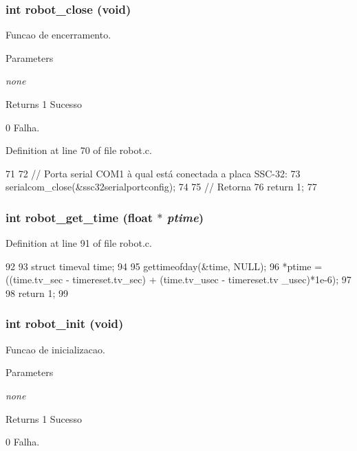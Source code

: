\subsubsection[{robot\_\-close}]{\setlength{\rightskip}{0pt plus 5cm}int robot\_\-close (void)}\label{robot_8c_a9a5e0a593aac8004a4b85da53e7354b3}


Funcao de encerramento. 
\begin{DoxyParams}{Parameters}
\item[{\em none}]\end{DoxyParams}
\begin{DoxyReturn}{Returns}
1 Sucesso 

0 Falha. 
\end{DoxyReturn}


Definition at line 70 of file robot.c.


\begin{DoxyCode}
71 {
72         // Porta serial COM1 à qual está conectada a placa SSC-32:
73         serialcom_close(&ssc32serialportconfig);
74         
75         // Retorna 
76         return 1; 
77 }                      
\end{DoxyCode}
\subsubsection[{robot\_\-get\_\-time}]{\setlength{\rightskip}{0pt plus 5cm}int robot\_\-get\_\-time (float $\ast$ {\em ptime})}\label{robot_8c_a03c4523c04948fd5b818ea22bf84480a}


Definition at line 91 of file robot.c.


\begin{DoxyCode}
92 {
93         struct timeval time;
94 
95         gettimeofday(&time, NULL);
96         *ptime = ((time.tv_sec - timereset.tv_sec) + (time.tv_usec - timereset.tv
      _usec)*1e-6);
97         
98         return 1;
99 }
\end{DoxyCode}
\subsubsection[{robot\_\-init}]{\setlength{\rightskip}{0pt plus 5cm}int robot\_\-init (void)}\label{robot_8c_af0d5680f7a8a1290035e7506e6bd947f}


Funcao de inicializacao. 
\begin{DoxyParams}{Parameters}
\item[{\em none}]\end{DoxyParams}
\begin{DoxyReturn}{Returns}
1 Sucesso 

0 Falha. 
\end{DoxyReturn}


